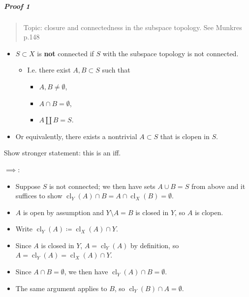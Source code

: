 \begin{solution}

\hfill

\begin{concept}

\hfill

\end{concept}

\hypertarget{proof-1-2}{%
\subparagraph{Proof 1}\label{proof-1-2}}

\begin{quote}
Topic: closure and connectedness in the subspace topology. See Munkres
p.148
\end{quote}

\begin{itemize}
\tightlist
\item
  \(S\subset X\) is \textbf{not } connected if \(S\) with the subspace
  topology is not connected.

  \begin{itemize}
  \tightlist
  \item
    I.e. there exist \(A, B \subset S\) such that

    \begin{itemize}
    \tightlist
    \item
      \(A, B \neq \emptyset\),
    \item
      \(A\cap B = \emptyset\),
    \item
      \(A {\coprod}B = S\).
    \end{itemize}
  \end{itemize}
\item
  Or equivalently, there exists a nontrivial \(A\subset S\) that is
  clopen in \(S\).
\end{itemize}

Show stronger statement: this is an iff.

\(\implies\):

\begin{itemize}
\tightlist
\item
  Suppose \(S\) is not connected; we then have sets \(A \cup B = S\)
  from above and it suffices to show
  \(\operatorname{cl}_Y(A) \cap B = A \cap\operatorname{cl}_X(B) = \emptyset\).
\item
  \(A\) is open by assumption and \(Y\setminus A = B\) is closed in
  \(Y\), so \(A\) is clopen.
\item
  Write
  \(\operatorname{cl}_Y(A) \coloneqq\operatorname{cl}_X(A) \cap Y\).
\item
  Since \(A\) is closed in \(Y\), \(A = \operatorname{cl}_Y(A)\) by
  definition, so
  \(A = \operatorname{cl}_Y(A) = \operatorname{cl}_X(A) \cap Y\).
\item
  Since \(A\cap B = \emptyset\), we then have
  \(\operatorname{cl}_Y(A) \cap B = \emptyset\).
\item
  The same argument applies to \(B\), so
  \(\operatorname{cl}_Y(B) \cap A = \emptyset\).
\end{itemize}


\end{solution}
